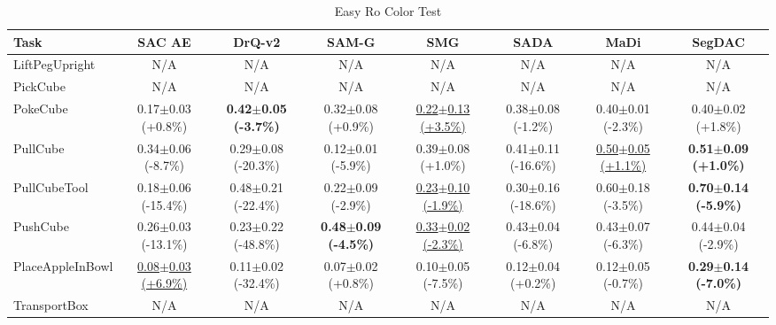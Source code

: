 \begin{table}[htbp]
\centering
\scriptsize
\caption{Easy Ro Color Test}
\label{tab:appendix_rocolortest_easy}
\begin{adjustbox}{max width=\textwidth}
\begin{tabular}{l*{7}{c}}
\toprule
\textbf{Task} & \textbf{SAC AE} & \textbf{DrQ-v2} & \textbf{SAM-G} & \textbf{SMG} & \textbf{SADA} & \textbf{MaDi} & \textbf{SegDAC} \\
\midrule
LiftPegUpright & N/A & N/A & N/A & N/A & N/A & N/A & N/A \\
PickCube & N/A & N/A & N/A & N/A & N/A & N/A & N/A \\
PokeCube & 0.17$\pm$0.03 \scriptsize{(+0.8\%)} & \textbf{0.42$\pm$0.05 \scriptsize{(-3.7\%)}} & 0.32$\pm$0.08 \scriptsize{(+0.9\%)} & \underline{0.22$\pm$0.13 \scriptsize{(+3.5\%)}} & 0.38$\pm$0.08 \scriptsize{(-1.2\%)} & 0.40$\pm$0.01 \scriptsize{(-2.3\%)} & 0.40$\pm$0.02 \scriptsize{(+1.8\%)} \\
PullCube & 0.34$\pm$0.06 \scriptsize{(-8.7\%)} & 0.29$\pm$0.08 \scriptsize{(-20.3\%)} & 0.12$\pm$0.01 \scriptsize{(-5.9\%)} & 0.39$\pm$0.08 \scriptsize{(+1.0\%)} & 0.41$\pm$0.11 \scriptsize{(-16.6\%)} & \underline{0.50$\pm$0.05 \scriptsize{(+1.1\%)}} & \textbf{0.51$\pm$0.09 \scriptsize{(+1.0\%)}} \\
PullCubeTool & 0.18$\pm$0.06 \scriptsize{(-15.4\%)} & 0.48$\pm$0.21 \scriptsize{(-22.4\%)} & 0.22$\pm$0.09 \scriptsize{(-2.9\%)} & \underline{0.23$\pm$0.10 \scriptsize{(-1.9\%)}} & 0.30$\pm$0.16 \scriptsize{(-18.6\%)} & 0.60$\pm$0.18 \scriptsize{(-3.5\%)} & \textbf{0.70$\pm$0.14 \scriptsize{(-5.9\%)}} \\
PushCube & 0.26$\pm$0.03 \scriptsize{(-13.1\%)} & 0.23$\pm$0.22 \scriptsize{(-48.8\%)} & \textbf{0.48$\pm$0.09 \scriptsize{(-4.5\%)}} & \underline{0.33$\pm$0.02 \scriptsize{(-2.3\%)}} & 0.43$\pm$0.04 \scriptsize{(-6.8\%)} & 0.43$\pm$0.07 \scriptsize{(-6.3\%)} & 0.44$\pm$0.04 \scriptsize{(-2.9\%)} \\
PlaceAppleInBowl & \underline{0.08$\pm$0.03 \scriptsize{(+6.9\%)}} & 0.11$\pm$0.02 \scriptsize{(-32.4\%)} & 0.07$\pm$0.02 \scriptsize{(+0.8\%)} & 0.10$\pm$0.05 \scriptsize{(-7.5\%)} & 0.12$\pm$0.04 \scriptsize{(+0.2\%)} & 0.12$\pm$0.05 \scriptsize{(-0.7\%)} & \textbf{0.29$\pm$0.14 \scriptsize{(-7.0\%)}} \\
TransportBox & N/A & N/A & N/A & N/A & N/A & N/A & N/A \\
\bottomrule
\end{tabular}
\end{adjustbox}
\end{table}

